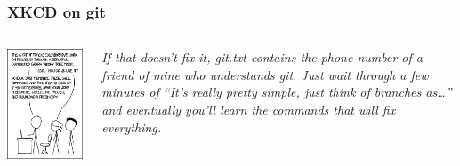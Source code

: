 \documentclass[10pt,svgnames,handout]{beamer}
\begin{document}
\begin{frame}
\label{xkcd_git}
\frametitle{XKCD on git \hfill\hyperlink{git_cons}{}}

\begin{columns}[T,onlytextwidth]
\includegraphics[width=\textwidth]{figures/xkcd-git.png}

\vfill
\emph{If that doesn't fix it, git.txt contains the phone number of a friend of mine who understands git.
Just wait through a few minutes of “It's really pretty simple, just think of branches as\ldots” and eventually you'll learn the commands that will fix everything.
}
\end{columns}

\end{frame}
\end{document}
